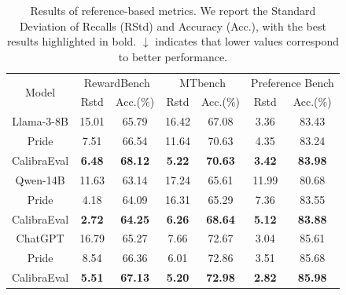 \documentclass[sigconf]{acmart}
\begin{document}
\begin{table}[]
\caption{
Results of reference-based metrics. We report the Standard Deviation of Recalls (RStd) and Accuracy (Acc.), with the best results highlighted in bold. $\downarrow$ indicates that lower values correspond to better performance.}
\begin{tabular}{c|cc|cc|cc}
\hline
\multirow{2}{*}{Model} & \multicolumn{2}{c|}{RewardBench} & \multicolumn{2}{c|}{MTbench}   & \multicolumn{2}{c}{Preference Bench} \\
                       & Rstd           & Acc.(\%)        & Rstd          & Acc.(\%)       & Rstd             & Acc.(\%)          \\ \hline
Llama-3-8B             & 15.01          & 65.79           & 16.42         & 67.08          & 3.36             & 83.43             \\
Pride                  & 7.51           & 66.54           & 11.64         & 70.63          & 4.35             & 83.24             \\
CalibraEval            & \textbf{6.48}  & \textbf{68.12}  & \textbf{5.22} & \textbf{70.63} & \textbf{3.42}    & \textbf{83.98}    \\ \hline
Qwen-14B               & 11.63          & 63.14           & 17.24         & 65.61          & 11.99            & 80.68             \\
Pride                  & 4.18           & 64.09           & 16.31         & 65.29          & 7.36             & 83.55             \\
CalibraEval            & \textbf{2.72}  & \textbf{64.25}  & \textbf{6.26} & \textbf{68.64} & \textbf{5.12}    & \textbf{83.88}    \\ \hline
ChatGPT                & 16.79          & 65.27           & 7.66          & 72.67          & 3.04             & 85.61             \\
Pride                  & 8.54           & 66.36           & 6.01          & 72.86          & 3.51             & 85.68             \\
CalibraEval            & \textbf{5.51}  & \textbf{67.13}  & \textbf{5.20} & \textbf{72.98} & \textbf{2.82}    & \textbf{85.98}    \\ \hline
\end{tabular}
\label{acc}
\end{table}
\end{document}
